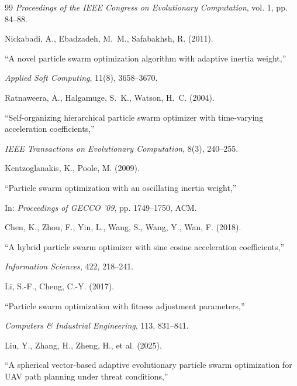 \documentclass[fleqn,10pt]{wlscirep}
\begin{document}
\begin{thebibliography}{99}
\textit{Proceedings of the IEEE Congress on Evolutionary Computation}, vol. 1, pp. 84--88.




Nickabadi, A., Ebadzadeh, M.~M., Safabakhsh, R. (2011).

``A novel particle swarm optimization algorithm with adaptive inertia weight,''

\textit{Applied Soft Computing}, 11(8), 3658--3670.




Ratnaweera, A., Halgamuge, S.~K., Watson, H.~C. (2004).

``Self-organizing hierarchical particle swarm optimizer with time-varying acceleration coefficients,''

\textit{IEEE Transactions on Evolutionary Computation}, 8(3), 240--255.




Kentzoglanakis, K., Poole, M. (2009).

``Particle swarm optimization with an oscillating inertia weight,''

In: \emph{Proceedings of GECCO '09}, pp. 1749--1750, ACM.




Chen, K., Zhou, F., Yin, L., Wang, S., Wang, Y., Wan, F. (2018).

``A hybrid particle swarm optimizer with sine cosine acceleration coefficients,''

\textit{Information Sciences}, 422, 218--241.




Li, S.-F., Cheng, C.-Y. (2017).

``Particle swarm optimization with fitness adjustment parameters,''

\textit{Computers \& Industrial Engineering}, 113, 831--841.




Liu, Y., Zhang, H., Zheng, H., et al. (2025).

``A spherical vector-based adaptive evolutionary particle swarm optimization for UAV path planning under threat conditions,''


\end{thebibliography}
\end{document}
